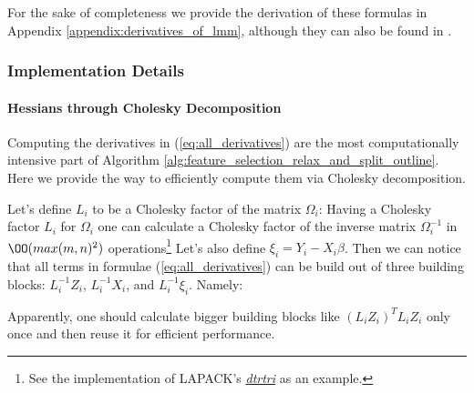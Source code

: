 \documentclass[11pt,letterpaper]{article}
\numberwithin{equation}{section} %
\numberwithin{figure}{section} %
\numberwithin{table}{section} %
\begin{document}
For the sake of completeness we provide the derivation of these formulas in Appendix \ref{appendix:derivatives_of_lmm}, although they can also be found in \cite{Lindstrom1988}.


\subsubsection{Implementation Details}
\paragraph{Hessians through Cholesky Decomposition}
Computing the derivatives in (\ref{eq:all_derivatives}) are the most computationally intensive part of Algorithm \ref{alg:feature_selection_relax_and_split_outline}. Here we provide the way to efficiently compute them via Cholesky decomposition. 

Let's define $L_i$ to be a Cholesky factor of the matrix $\Omega_i$:
Having a Cholesky factor $L_i$ for $\Omega_i$ one can calculate a Cholesky factor of the inverse matrix $\Omega_i^{-1}$ in $\OO(max(m, n)^2)$ operations\footnote{See the implementation of LAPACK's \textit{\href{http://www.netlib.org/lapack/explore-html/da/dba/group__double_o_t_h_e_rcomputational_ga97c5ddb103f5f6bc2dc060886aaf2ffc.html}{dtrtri}} as an example.} Let's also define $\xi_i = Y_i - X_i\beta$. Then we can notice that all terms in formulae (\ref{eq:all_derivatives}) can be build out of three building blocks: $L^{-1}_iZ_i$, $L^{-1}_iX_i$, and $L^{-1}_i\xi_i$. Namely:

Apparently, one should calculate bigger building blocks like $(L_iZ_i)^TL_iZ_i$ only once and then reuse it for efficient performance.
\end{document}
